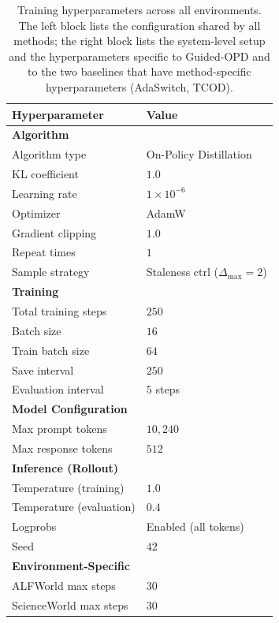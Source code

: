 \documentclass[11pt]{article}
\begin{document}
\begin{table}[t]
\centering
\caption{Training hyperparameters across all environments. The left block lists the configuration shared by all methods; the right block lists the system-level setup and the hyperparameters specific to Guided-OPD and to the two baselines that have method-specific hyperparameters (AdaSwitch, TCOD).}
\setlength{\tabcolsep}{2.8pt}
\label{tab:train_params}
\small
\begin{minipage}[t]{0.48\textwidth}
\centering
\begin{tabular}{ll}
\toprule
\textbf{Hyperparameter} & \textbf{Value} \\
\midrule
\textbf{Algorithm} & \\
\quad Algorithm type & On-Policy Distillation \\
\quad KL coefficient & $1.0$ \\
\quad Learning rate & $1 \times 10^{-6}$ \\
\quad Optimizer & AdamW \\
\quad Gradient clipping & $1.0$ \\
\quad Repeat times & $1$ \\
\quad Sample strategy & Staleness ctrl ($\Delta_{\max}\!=\!2$) \\
\midrule
\textbf{Training} & \\
\quad Total training steps & $250$ \\
\quad Batch size & $16$ \\
\quad Train batch size & $64$ \\
\quad Save interval & $250$ \\
\quad Evaluation interval & $5$ steps \\
\midrule
\textbf{Model Configuration} & \\
\quad Max prompt tokens & $10{,}240$ \\
\quad Max response tokens & $512$ \\
\midrule
\textbf{Inference (Rollout)} & \\
\quad Temperature (training) & $1.0$ \\
\quad Temperature (evaluation) & $0.4$ \\
\quad Logprobs & Enabled (all tokens) \\
\quad Seed & $42$ \\
\midrule
\textbf{Environment-Specific} & \\
\quad ALFWorld max steps & $30$ \\
\quad ScienceWorld max steps & $30$ \\

\end{tabular}
\end{minipage}
\end{table}
\end{document}
